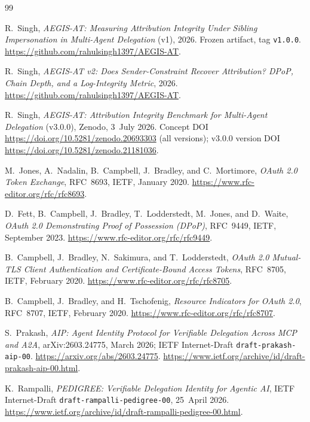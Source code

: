 \documentclass[11pt]{article}
\newcommand{\code}[1]{\texttt{#1}}
\begin{document}
\begin{thebibliography}{99}

 R.~Singh, \emph{AEGIS-AT: Measuring Attribution Integrity
Under Sibling Impersonation in Multi-Agent Delegation} (v1), 2026. Frozen
artifact, tag \code{v1.0.0}.
\url{https://github.com/rahulsingh1397/AEGIS-AT}.

 R.~Singh, \emph{AEGIS-AT v2: Does Sender-Constraint Recover
Attribution? DPoP, Chain Depth, and a Log-Integrity Metric}, 2026.
\url{https://github.com/rahulsingh1397/AEGIS-AT}.

 R.~Singh, \emph{AEGIS-AT: Attribution Integrity Benchmark
for Multi-Agent Delegation} (v3.0.0), Zenodo, 3~July 2026. Concept DOI
\url{https://doi.org/10.5281/zenodo.20693303} (all versions); v3.0.0 version DOI
\url{https://doi.org/10.5281/zenodo.21181036}.

 M.~Jones, A.~Nadalin, B.~Campbell, J.~Bradley, and C.~Mortimore,
\emph{OAuth 2.0 Token Exchange}, RFC~8693, IETF, January 2020.
\url{https://www.rfc-editor.org/rfc/rfc8693}.

 D.~Fett, B.~Campbell, J.~Bradley, T.~Lodderstedt, M.~Jones, and
D.~Waite, \emph{OAuth 2.0 Demonstrating Proof of Possession (DPoP)}, RFC~9449,
IETF, September 2023. \url{https://www.rfc-editor.org/rfc/rfc9449}.

 B.~Campbell, J.~Bradley, N.~Sakimura, and T.~Lodderstedt,
\emph{OAuth 2.0 Mutual-TLS Client Authentication and Certificate-Bound Access
Tokens}, RFC~8705, IETF, February 2020.
\url{https://www.rfc-editor.org/rfc/rfc8705}.

 B.~Campbell, J.~Bradley, and H.~Tschofenig, \emph{Resource
Indicators for OAuth 2.0}, RFC~8707, IETF, February 2020.
\url{https://www.rfc-editor.org/rfc/rfc8707}.

 S.~Prakash, \emph{AIP: Agent Identity Protocol for Verifiable
Delegation Across MCP and A2A}, arXiv:2603.24775, March 2026; IETF
Internet-Draft \code{draft-prakash-aip-00}.
\url{https://arxiv.org/abs/2603.24775}.
\url{https://www.ietf.org/archive/id/draft-prakash-aip-00.html}.

 K.~Rampalli, \emph{PEDIGREE: Verifiable Delegation Identity
for Agentic AI}, IETF Internet-Draft \code{draft-rampalli-pedigree-00}, 25~April
2026. \url{https://www.ietf.org/archive/id/draft-rampalli-pedigree-00.html}.


\end{thebibliography}
\end{document}
